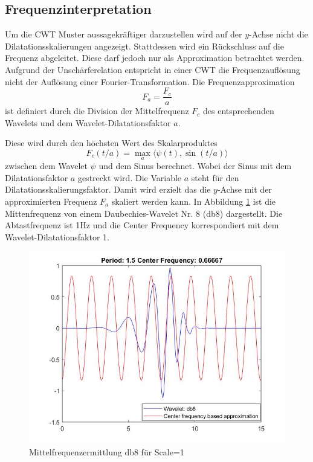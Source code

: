 \begin{refsection}
\subsection{Frequenzinterpretation}
Um die CWT Muster aussagekräftiger darzustellen wird auf der $y$-Achse nicht die Dilatationsskalierungen angezeigt. 
Stattdessen wird ein Rückschluss auf die Frequenz abgeleitet. 
Diese darf jedoch nur als Approximation betrachtet werden.
Aufgrund der Unschärferelation entspricht in einer CWT die Frequenzauflösung nicht der Auflösung einer Fourier-Transformation. 
Die Frequenzapproximation 
\begin{equation}
F_a=\dfrac{F_c}{a}
\end{equation}
ist definiert durch die Division der Mittelfrequenz $F_c$ des entsprechenden Wavelets und dem Wavelet-Dilatationsfaktor $a$.

Diese wird durch den höchsten Wert des Skalarproduktes 
\begin{equation}
F_c(t/a) = \max_a\langle \psi(t),\sin (t/a)\rangle
\end{equation}
zwischen dem Wavelet $\psi$ und dem Sinus berechnet.
Wobei der Sinus mit dem Dilatationsfaktor $a$ gestreckt wird.
Die Variable $a$ steht für den Dilatationsskalierungsfaktor. 
Damit wird erzielt das die $y$-Achse mit der approximierten Frequenz $F_a$ skaliert werden kann.
In Abbildung \ref{fig:Mittenfrequ} ist die Mittenfrequenz von einem Daubechies-Wavelet Nr. 8 (db8) dargestellt.
Die Abtastfrequenz ist 1Hz und die Center Frequency korrespondiert mit dem Wavelet-Dilatationsfaktor 1.   

\begin{figure}
	\centering
	\includegraphics [width=0.7\linewidth] {papers/gis/Bilder/Mittenfrequenz}
	\caption{Mittelfrequenzermittlung db8 für Scale=1}
	\label{fig:Mittenfrequ}
\end{figure}



\end{refsection}
